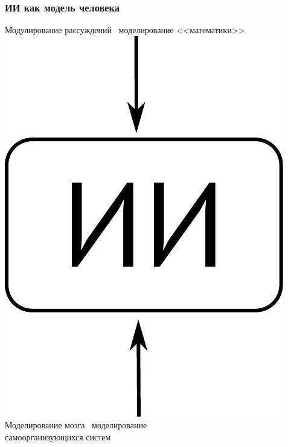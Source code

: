 \documentclass[10pt]{beamer}
\begin{document}
\begin{frame}
  \frametitle{ИИ как модель человека}
  \begin{center}
    Модулирование рассуждений \to\ моделирование <<математики>>\\
    \includegraphics[width=0.2\linewidth]{pics/ai-approach.pdf}\\
    Моделирование мозга \to\ моделирование\\ самоорганизующихся систем
  \end{center}
\end{frame}
\end{document}
